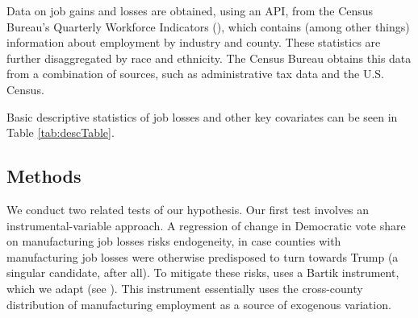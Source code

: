 \documentclass[]{AEA}
\begin{document}
Data on job gains and losses are obtained, using an API, from the Census
Bureau's Quarterly Workforce Indicators (\cite{QWI}), which contains
(among other things) information about employment by industry and
county. These statistics are further disaggregated by race and
ethnicity. The Census Bureau obtains this data from a combination of
sources, such as administrative tax data and the U.S. Census.

Basic descriptive statistics of job losses and other key covariates can
be seen in Table \ref{tab:descTable}. \FloatBarrier

\begin{table}[!h]

\caption{\label{tab:descTable}Manufacturing Job Changes 2004-2015}
\centering
{}
\end{table}
\FloatBarrier

\subsection{Methods} 
\label{methodssec}

We conduct two related tests of our hypothesis. Our first test involves
an instrumental-variable approach. A regression of change in Democratic
vote share on manufacturing job losses risks endogeneity, in case
counties with manufacturing job losses were otherwise predisposed to
turn towards Trump (a singular candidate, after all). To mitigate these
risks, \cite{Baccini21} uses a Bartik instrument, which we adapt (see
\cite{Bartik91}). This instrument essentially uses the cross-county
distribution of manufacturing employment as a source of exogenous
variation.
\end{document}
